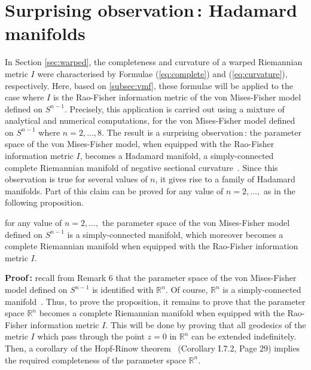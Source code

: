 \documentclass{svmult}
\begin{document}
\section{Surprising observation\,: Hadamard manifolds} \label{sec:hadamard}
In Section \ref{sec:warped}, the completeness and curvature of a warped Riemannian metric $I$ were characterised by Formulae (\ref{eq:complete}) and (\ref{eq:curvature}), respectively. Here, based on \ref{subsec:vmf}, these formulae will be applied to the case where $I$ is the Rao-Fisher information metric of the von Mises-Fisher model defined on $S^{n-1}$. Precisely, this application is carried out using a mixture of analytical and numerical computations, for the von Mises-Fisher model defined on $S^{n-1}$ where $n = 2,\ldots,8$. The result is a surprising observation\,: the parameter space of the von Mises-Fisher model, when equipped with the Rao-Fisher information metric $I$, becomes a Hadamard manifold, a simply-connected complete Riemannian manifold of negative sectional curvature~\cite{petersen,chavel}. Since this observation is true for several values of $n$, it gives rise to a family of Hadamard manifolds. Part of this claim can be proved for any value of $n = 2,\ldots,$ as in the following proposition.  
\begin{proposition} \label{prop:simpcomplete}
  for any value of $n = 2,\ldots,$ the parameter space of the von Mises-Fisher model defined on $S^{n-1}$ is a simply-connected manifold, which moreover becomes a complete Riemannian manifold when equipped with the Rao-Fisher information metric $I$. 
\end{proposition}
\vspace{0.1cm}
\textbf{Proof\,:} recall from Remark 6 that the parameter space of the von Mises-Fisher model defined on $S^{n-1}$ is identified with $\mathbb{R}^n$. Of course, $\mathbb{R}^n$ is a simply-connected manifold~\cite{spanier}. Thus, to prove the proposition, it remains to prove that the parameter space $\mathbb{R}^n$ becomes a complete Riemannian manifold when equipped with the Rao-Fisher information metric $I$. This will be done by proving that all geodesics of the metric $I$ which pass through the point $z = 0$ in $\mathbb{R}^n$ can be extended indefinitely. Then, a corollary of the Hopf-Rinow theorem~\cite{chavel} (Corollary I.7.2, Page 29) implies the required completeness of the parameter space $\mathbb{R}^n$. 
\end{document}
